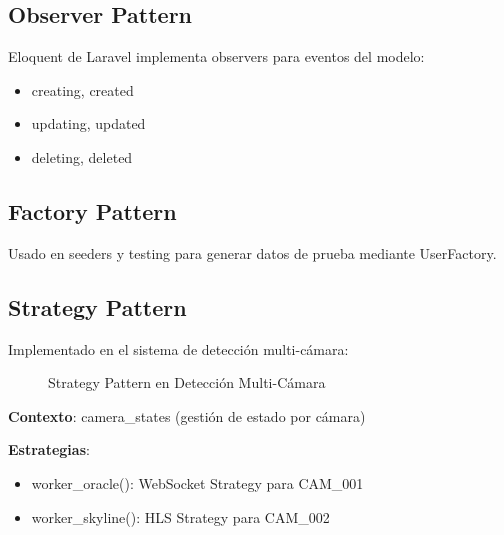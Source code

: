 \subsection{Observer Pattern}

Eloquent de Laravel implementa observers para eventos del modelo:
\begin{itemize}
    \item creating, created
    \item updating, updated
    \item deleting, deleted
\end{itemize}

\subsection{Factory Pattern}

Usado en seeders y testing para generar datos de prueba mediante UserFactory.

\subsection{Strategy Pattern}

Implementado en el sistema de detección multi-cámara:

\begin{figure}[H]
\centering
{}
\caption{Strategy Pattern en Detección Multi-Cámara}
\end{figure}

\textbf{Contexto}: camera\_states (gestión de estado por cámara)

\textbf{Estrategias}:
\begin{itemize}
    \item worker\_oracle(): WebSocket Strategy para CAM\_001
    \item worker\_skyline(): HLS Strategy para CAM\_002
\end{itemize}


